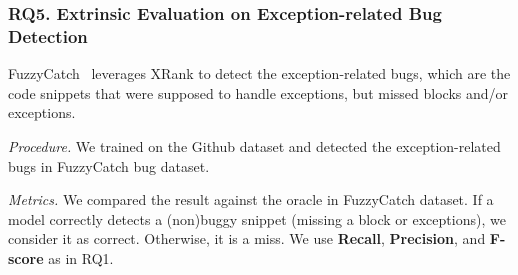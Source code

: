 
\subsubsection{RQ5. Extrinsic Evaluation on Exception-related Bug Detection\\}


 FuzzyCatch~\cite{xrank-fse20} leverages XRank
to detect the exception-related bugs, which are the code snippets that
were supposed to handle exceptions, but missed
 blocks and/or exceptions.

{\em Procedure.} We trained {\tool} on the Github dataset and detected
the exception-related bugs in FuzzyCatch bug dataset.


{\em Metrics.} We compared the result against the oracle in FuzzyCatch
dataset. If a model correctly detects a (non)buggy snippet (missing a
 block or exceptions), we consider it as correct.
Otherwise, it is a miss. We use {\bf Recall}, {\bf Precision}, and
{\bf F-score} as in RQ1.
